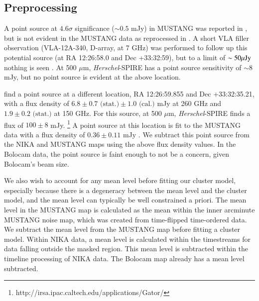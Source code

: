 \documentclass[twocolumn,traditabstract]{aa}
\begin{document}
\subsection{Preprocessing}
\label{sec:preprocessing}


A point source at $4.6\sigma$ significance ($\sim 0.5$ mJy) in MUSTANG was reported in \citet{korngut2011}, but is not
evident in the MUSTANG data as reprocessed in \citet{romero2017}. A short VLA filler observation (VLA-12A-340, D-array, at 7 GHz)
was performed to follow up this potential source (at RA 12:26:58.0 and Dec +33:32:59), but to a limit of $\sim 50 {\rm \mu Jy}$ nothing
is seen \citep{romero2017}. At 500 $\mu$m, \emph{Herschel}-SPIRE has a point source sensitivity of $\sim 8$ mJy, but no point
source is evident at the above location.

\citet{adam2015} find a point source at a different location, RA 12:26:59.855 and Dec +33:32:35.21, with a flux density of 
$6.8 \pm 0.7 \text{ (stat.)} \pm 1.0 \text{ (cal.)}$ mJy at 260 GHz and $1.9 \pm 0.2 \text{ (stat.)}$ at 150 GHz.
For this source, at 500 $\mu$m, \emph{Herschel}-SPIRE finds a flux of $100 \pm 8$ mJy.
\footnote{{http://irsa.ipac.caltech.edu/applications/Gator/}} A point source at this location is fit to the MUSTANG
data with a flux density of $0.36 \pm 0.11$ mJy \citep{romero2017}.
We subtract this point source from the NIKA and MUSTANG maps using the above flux density values.
In the Bolocam data, the point source is faint enough to not be a concern, given Bolocam's beam size.


We also wish to account for any mean level before fitting our cluster model, especially because there is a degeneracy
between the mean level and the cluster model, and the mean level can typically be well constrained a priori.
The mean level in the MUSTANG map is calculated
as the mean within the inner arcminute MUSTANG noise map, which was created from time-flipped time-ordered data.
We subtract the mean level from the MUSTANG map before fitting a cluster model.
Within NIKA data, a mean level is calculated within the timestreams for data falling outside
the masked region. This mean level is subtracted within the timeline processing of NIKA data. The Bolocam map already has
a mean level subtracted.
\end{document}
